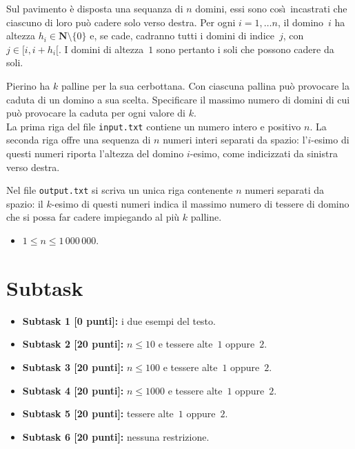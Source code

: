 \renewcommand{\nomebreve}{easyfall}
\renewcommand{\titolo}{Tutti gi\`u per terra}

\introduzione{}

  Sul pavimento \`e disposta una sequanza di $n$ domini, essi sono cos\`\i\ incastrati che ciascuno di loro pu\`o cadere solo verso destra.  
  Per ogni $i=1,\ldots n$,
  il domino~$i$ ha altezza $h_i\in \mathbf{N}\setminus \{0\}$ e, se cade,
  cadranno tutti i domini di indice~$j$, con~$j \in [i,i+h_i[$.
  I domini di altezza~$1$ sono pertanto i soli che possono cadere da soli.  

  Pierino ha $k$ palline per la sua cerbottana.
  Con ciascuna pallina pu\`o provocare la caduta di un domino a sua scelta.
  Specificare il massimo numero di domini di cui pu\`o provocare la caduta
  per ogni valore di $k$.\\


La prima riga del file \verb'input.txt' contiene un numero intero e positivo $n$.
La seconda riga offre una sequenza di $n$ numeri interi separati da spazio:
l'$i$-esimo di questi numeri riporta l'altezza del domino $i$-esimo, come indicizzati da sinistra verso destra.

Nel file \verb'output.txt' si scriva un unica riga contenente $n$ numeri separati da spazio:
il $k$-esimo di questi numeri indica il massimo numero di tessere di domino
che si possa far cadere impiegando al pi\`u $k$ palline.\\



\begin{itemize}[nolistsep, noitemsep]
  \item $1 \le n \le 1\,000\,000$.
\end{itemize}
  
  \section*{Subtask}
  \begin{itemize}
    \item \textbf{Subtask 1 [0 punti]:} i due esempi del testo.
    \item \textbf{Subtask 2 [20 punti]:} $n \leq 10$ e tessere alte~$1$ oppure~$2$.
    \item \textbf{Subtask 3 [20 punti]:} $n \leq 100$ e tessere alte~$1$ oppure~$2$.
    \item \textbf{Subtask 4 [20 punti]:} $n \leq 1000$ e tessere alte~$1$ oppure~$2$.
    \item \textbf{Subtask 5 [20 punti]:} tessere alte~$1$ oppure~$2$.
    \item \textbf{Subtask 6 [20 punti]:} nessuna restrizione.
  \end{itemize}
  
